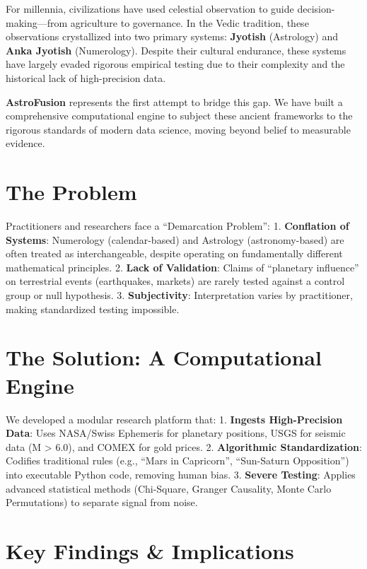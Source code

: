 \documentclass[
  11pt,
  a4paper,
  oneside,
  openany]{report}
\begin{document}
For millennia, civilizations have used celestial observation to guide
decision-making---from agriculture to governance. In the Vedic
tradition, these observations crystallized into two primary systems:
\textbf{Jyotish} (Astrology) and \textbf{Anka Jyotish} (Numerology).
Despite their cultural endurance, these systems have largely evaded
rigorous empirical testing due to their complexity and the historical
lack of high-precision data.

\textbf{AstroFusion} represents the first attempt to bridge this gap. We
have built a comprehensive computational engine to subject these ancient
frameworks to the rigorous standards of modern data science, moving
beyond belief to measurable evidence.

\section{The Problem}\label{the-problem}

Practitioners and researchers face a ``Demarcation Problem'': 1.
\textbf{Conflation of Systems}: Numerology (calendar-based) and
Astrology (astronomy-based) are often treated as interchangeable,
despite operating on fundamentally different mathematical principles. 2.
\textbf{Lack of Validation}: Claims of ``planetary influence'' on
terrestrial events (earthquakes, markets) are rarely tested against a
control group or null hypothesis. 3. \textbf{Subjectivity}:
Interpretation varies by practitioner, making standardized testing
impossible.

\section{The Solution: A Computational
Engine}\label{the-solution-a-computational-engine}

We developed a modular research platform that: 1. \textbf{Ingests
High-Precision Data}: Uses NASA/Swiss Ephemeris for planetary positions,
USGS for seismic data (M \textgreater{} 6.0), and COMEX for gold prices.
2. \textbf{Algorithmic Standardization}: Codifies traditional rules
(e.g., ``Mars in Capricorn'', ``Sun-Saturn Opposition'') into executable
Python code, removing human bias. 3. \textbf{Severe Testing}: Applies
advanced statistical methods (Chi-Square, Granger Causality, Monte Carlo
Permutations) to separate signal from noise.

\section{Key Findings \& Implications}\label{key-findings-implications}
\end{document}
